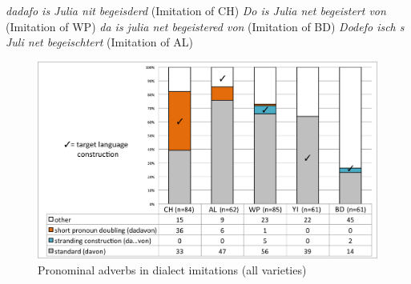 \documentclass[output=paper]{LSP/langsci}
\begin{document}
\eal
\ex \textit{dadafo is Julia nit begeisderd} (Imitation of CH) \label{davon1}
\ex \textit{Do is Julia net begeistert von} (Imitation of WP) 
\ex \textit{da is julia net begeistered von} (Imitation of BD) 
\ex \textit{Dodefo isch s Juli net begeischtert} (Imitation of AL)
\zl

\begin{figure}[h!]
\centering
\includegraphics[scale=0.42]{illustrations/schaf_etal_fig3}%
\caption{\label{diagramdadavon} Pronominal adverbs in dialect imitations (all varieties)}
	\end{figure}
\FloatBarrier
\end{document}
